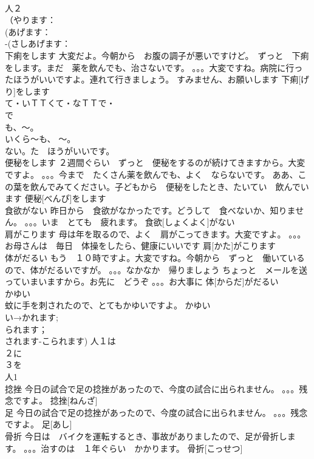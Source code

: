 \documentclass[8pt]{extreport}
\begin{document}
\begin{CJK}{UTF8}{min}
\\	人２
\\	（やります：
\\	(あげます：
\\	-(さしあげます：
\\	下痢をします	大変だよ。今朝から　お腹の調子が悪いですけど。　ずっと　下痢をします。まだ　薬を飲んでも、治さないです。 。。。大変ですね。病院に行ったほうがいいですよ。連れて行きましょう。 すみません、お願いします	下痢[げり]をします			
\\	て・いＴＴくて・なＴＴで・
\\	で
\\	も、～。
\\	いくら～も、 ～。
\\	ない。た　ほうがいいです。
\\	便秘をします	２週間ぐらい　ずっと　便秘をするのが続けてきますから。大変ですよ。 。。。今まで　たくさん薬を飲んでも、よく　ならないです。 ああ、この葉を飲んでみてください。子どもから　便秘をしたとき、たいてい　飲んでいます	便秘[べんぴ]をします			
\\	食欲がない	昨日から　食欲がなかったです。どうして　食べないか、知りません。 。。。いま　とても　疲れます。	食欲[しょくよく]がない			
\\	肩がこります	母は年を取るので、よく　肩がこってきます。大変ですよ。 。。。お母さんは　毎日　体操をしたら、健康にいいです	肩[かた]がこります			
\\	体がだるい	もう　１０時ですよ。大変ですね。今朝から　ずっと　働いているので、体がだるいですが。 。。。なかなか　帰りましょう ちょっと　メールを送っていまいますから。お先に　どうぞ 。。。お大事に	体[からだ]がだるい			
\\	かゆい
\\	蚊に手を刺されたので、とてもかゆいですよ。	かゆい
\\	い→かれます;
\\	られます；
\\	されます-こられます) 人１は　
\\	２に　
\\	３を　
\\	人1 
\\	捻挫	今日の試合で足の捻挫があったので、今度の試合に出られません。 。。。残念ですよ。	捻挫[ねんざ]			
\\	足	今日の試合で足の捻挫があったので、今度の試合に出られません。 。。。残念ですよ。	足[あし]			
\\	骨折	今日は　バイクを運転するとき、事故がありましたので、足が骨折します。 。。。治すのは　１年ぐらい　かかります。	骨折[こっせつ]			

\end{CJK}
\end{document}
